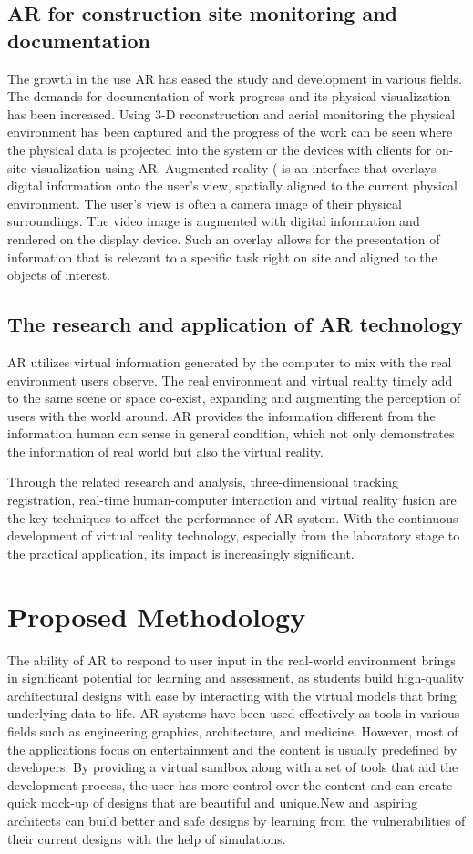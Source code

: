 \documentclass[conference]{IEEEtran}
\begin{document}
\subsection{AR for construction site monitoring and documentation}
The growth in the use AR has eased the study and development in various fields. The demands for documentation of work progress and its physical visualization has been increased. Using 3-D reconstruction and aerial monitoring the physical environment has been captured and the progress of the work can be seen where the physical data is projected into the system or the devices with clients for on-site visualization using AR\cite{sitemonitoring}. Augmented reality ( is an interface that overlays digital information onto the user's view, spatially aligned to the current physical environment. The user's view is often a camera image of their physical surroundings. The video image is augmented with digital information and rendered on the display device. Such an overlay allows for the presentation of information that is relevant to a specific task right on site and aligned to the objects of interest.
\subsection{The research and application of AR technology}
AR  utilizes virtual information generated by the computer to mix with the real environment users observe. The real environment and virtual reality timely add to the same scene or space co-exist, expanding and augmenting the perception of users with the world around. AR provides the information different from the information human can sense in general condition, which not only demonstrates the information of real world but also the virtual reality.

Through the related research and analysis, three-dimensional tracking registration, real-time human-computer interaction and virtual reality fusion are the key techniques to affect the performance of AR system\cite{researchar}. With the continuous development of virtual reality technology, especially from the laboratory stage to the practical application, its impact is increasingly significant.
\section{Proposed Methodology}
The ability of AR to respond to user input in the real-world environment brings in significant potential for learning and assessment, as students build high-quality architectural designs with ease by interacting with the virtual models that bring underlying data to life. AR systems have been used effectively as tools in various fields such as engineering graphics, architecture, and medicine. However, most of the applications focus on entertainment and the content is usually predefined by developers. By providing a virtual sandbox along with a set of tools that aid the development process, the user has more control over the content and can create quick mock-up of designs that are beautiful and unique.New and aspiring architects can build better and safe designs by learning from the vulnerabilities of their current designs with the help of simulations.
\end{document}
